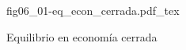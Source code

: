 \begin{figure}[h]
\centering
\def\svgwidth{0.5\textwidth}
{fig06_01-eq_econ_cerrada.pdf_tex}
\caption{Equilibrio en economía cerrada}
\label{fig06_01-eq_econ_cerrada}
\end{figure}